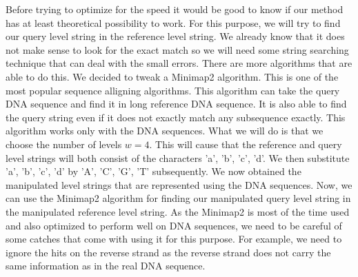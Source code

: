Before trying to optimize for the speed it would be good to know if our method
has at least theoretical possibility to work. For this purpose, we will try to
find our query level string in the reference level string. We already know that
it does not make sense to look for the exact match so we will need some string searching
technique that can deal with the small errors. There are more algorithms that are able
to do this. We decided to tweak a Minimap2 \cite{li2018minimap2} algorithm. This is
one of the most popular sequence alligning algorithms. This algorithm can take the
query DNA sequence and find it in long reference DNA sequence. It is also able to
find the query string even if it does not exactly match any subsequence exactly.
This algorithm works only with the DNA sequences. What we will do is that we choose
the number of levels $w=4$.
This will cause that the reference and query level strings will both consist of
the characters 'a', 'b', 'c', 'd'. We then substitute 'a', 'b', 'c', 'd' by
'A', 'C', 'G', 'T' subsequently. We now obtained the manipulated level strings that
are represented using the DNA sequences. Now, we can use the Minimap2 algorithm for
finding our manipulated query level string in the manipulated reference level string.
As the Minimap2 is most of the time used and also optimized to perform well on DNA
sequences, we need to be careful of some catches that come with using it for this
purpose. For example, we need to ignore the hits on the reverse strand as the
reverse strand does not carry the same information as in the real DNA sequence.

